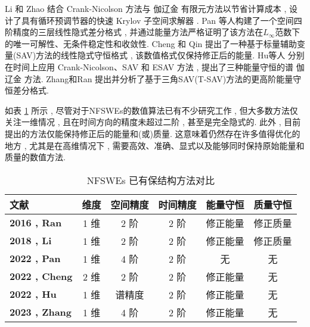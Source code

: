 Li 和 Zhao \cite{liFastEnergyConserving2018} 结合 Crank-Nicolson 方法与 伽辽金 有限元方法以节省计算成本 , 设计了具有循环预调节器的快速 Krylov 子空间求解器 . 
Pan 等人\cite{panFourthorderDifferenceScheme2022}构建了一个空间四阶精度的三层线性隐式差分格式 , 并通过能量方法严格证明了该方法在$L_{\infty}$范数下的唯一可解性、无条件稳定性和收敛性.
Cheng 和 Qin \cite{chengConvergenceEnergyconservingScheme2022} 提出了一种基于标量辅助变量(SAV)方法的线性隐式守恒格式 , 该数值格式仅保持修正后的能量.
Hu等人 \cite{huEfficientEnergyPreserving2022} 分别在时间上应用 Crank-Nicolson、SAV 和 ESAV 方法 , 提出了三种能量守恒的谱 伽辽金 方法.
Zhang和Ran \cite{zhangHighorderStructurepreservingDifference2023} 提出并分析了基于三角SAV(T-SAV)方法的更高阶能量守恒差分格式.

如表 \ref{tab:NFSWEs} 所示 , 尽管对于NFSWEs的数值算法已有不少研究工作 , 但大多数方法仅关注一维情况 , 且在时间方向的精度未超过二阶 , 甚至是完全隐式的.
此外 , 目前提出的方法仅能保持修正后的能量和(或)质量.
这意味着仍然存在许多值得优化的地方 , 尤其是在高维情况下 , 需要高效、准确、显式以及能够同时保持原始能量和质量的数值方法.
\begin{table}[htbp]
    \centering
    \small
    \caption{NFSWEs 已有保结构方法对比}
        \begin{tabular}{lccccc}
        \toprule
        \textcolor[rgb]{0 , 0 , 0}{\textbf{文献}} & \textcolor[rgb]{0 , 0 , 0}{\textbf{维度}} & \textcolor[rgb]{0 , 0 , 0}{\textbf{空间精度}} & \textcolor[rgb]{0 , 0 , 0}{\textbf{时间精度}} & \textcolor[rgb]{0 , 0 , 0}{\textbf{能量守恒}} & \textcolor[rgb]{0 , 0 , 0}{\textbf{质量守恒}} \\
        \midrule
        \textcolor[rgb]{0 , 0 , 0}{\textbf{\cite{ranLinearlyImplicitConservative2016}{2016 , Ran}}} & 1 维   & 2 阶   & 2 阶   & 修正能量  & 修正质量 \\
        \midrule
        \textcolor[rgb]{0 , 0 , 0}{\textbf{\cite{liFastEnergyConserving2018}{2018 , Li}}} & 1 维   & 2 阶   & 2 阶   & 修正能量  & 修正质量 \\
        \midrule
        \textcolor[rgb]{0 , 0 , 0}{\textbf{\cite{panFourthorderDifferenceScheme2022}{2022 , Pan}}} & 1 维   & 4 阶   & 2 阶   & 无     & 无 \\
        \midrule
        \textcolor[rgb]{0 , 0 , 0}{\textbf{\cite{chengConvergenceEnergyconservingScheme2022}{2022 , Cheng}}} & 2 维   & 2 阶   & 2 阶   & 修正能量  & 无 \\
        \midrule
        \textcolor[rgb]{0 , 0 , 0}{\textbf{\cite{huEfficientEnergyPreserving2022}{2022 , Hu}}} & 1 维   & 谱精度   & 2 阶   & 修正能量  & 无 \\
        \midrule
        \textcolor[rgb]{0 , 0 , 0}{\textbf{\cite{zhangHighorderStructurepreservingDifference2023}{2023 , Zhang}}} & 1 维   & 4 阶   & 2 阶   & 修正能量  & 无 \\
        \bottomrule
        \end{tabular}%
    \label{tab:NFSWEs}%
    \end{table}%
